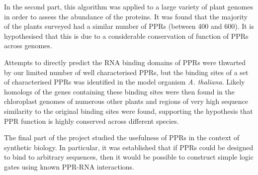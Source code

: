 \documentclass[11pt,a4paper, wide, twoside]{IIBproject}
\begin{document}
{In the second part, this algorithm was applied to a large variety of plant 
genomes in order to assess the abundance of the proteins.
It was found that the majority of the plants surveyed had a similar number of
PPRs (between 400 and 600).
It is hypothesised that this is due to a considerable conservation of function
of PPRs across genomes.

Attempts to directly predict the RNA binding domains of PPRs were thwarted by
our limited number of well characterised PPRs, but the binding sites of
a set of characterised PPRs was identified in the model organism 
\emph{A. thaliana}.
Likely homologs of the genes containing these binding sites were then found in
the chloroplast genomes of numerous other plants and regions of very high
sequence similarity to the original binding sites were found, supporting the
hypothesis that PPR function is highly conserved across different species.

The final part of the project studied the usefulness of PPRs in the context of
synthetic biology.
In particular, it was established that if PPRs could be designed to bind to 
arbitrary sequences, then it would be possible to construct simple logic gates
using known PPR-RNA interactions.

}

\clearpage %


\setcounter{tocdepth}{1}
\tableofcontents %

\clearpage %


\pagestyle{mainstyle}



 

 
 
% 
% 

\end{document}

